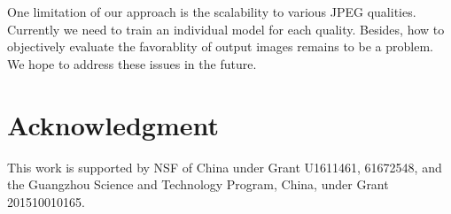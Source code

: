 \documentclass[10pt,twocolumn,letterpaper]{article}
\begin{document}
One limitation of our approach is the scalability to various JPEG qualities. Currently we need to train an individual model for each quality. Besides, how to objectively evaluate the favorablity of output images remains to be a problem. We hope to address these issues in the future.

\section*{Acknowledgment}
This work is supported by NSF of China under Grant U1611461, 61672548, and the Guangzhou Science and Technology Program, China, under Grant 201510010165.

{\small


}
\end{document}
